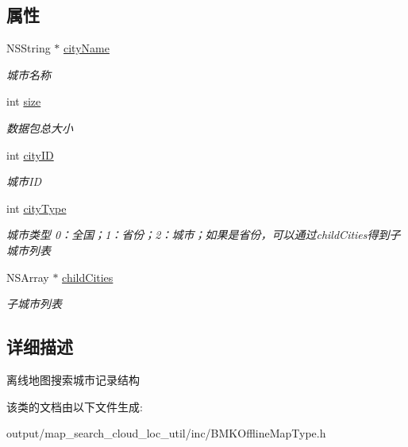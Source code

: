 \subsection*{属性}
\begin{DoxyCompactItemize}
\item 
\hypertarget{interface_b_m_k_o_l_search_record_a9b511c21c21f4b67eef345b11c0e9826}{N\+S\+String $\ast$ \hyperlink{interface_b_m_k_o_l_search_record_a9b511c21c21f4b67eef345b11c0e9826}{city\+Name}}\label{interface_b_m_k_o_l_search_record_a9b511c21c21f4b67eef345b11c0e9826}

\begin{DoxyCompactList}\small\item\em 城市名称 \end{DoxyCompactList}\item 
\hypertarget{interface_b_m_k_o_l_search_record_a65d925120ac45eec0047bad23225f67f}{int \hyperlink{interface_b_m_k_o_l_search_record_a65d925120ac45eec0047bad23225f67f}{size}}\label{interface_b_m_k_o_l_search_record_a65d925120ac45eec0047bad23225f67f}

\begin{DoxyCompactList}\small\item\em 数据包总大小 \end{DoxyCompactList}\item 
\hypertarget{interface_b_m_k_o_l_search_record_a45d36f0768cca26895c7078900ad8d7b}{int \hyperlink{interface_b_m_k_o_l_search_record_a45d36f0768cca26895c7078900ad8d7b}{city\+I\+D}}\label{interface_b_m_k_o_l_search_record_a45d36f0768cca26895c7078900ad8d7b}

\begin{DoxyCompactList}\small\item\em 城市\+I\+D \end{DoxyCompactList}\item 
\hypertarget{interface_b_m_k_o_l_search_record_a74c11b249d3d97503c4a4efa880cc99a}{int \hyperlink{interface_b_m_k_o_l_search_record_a74c11b249d3d97503c4a4efa880cc99a}{city\+Type}}\label{interface_b_m_k_o_l_search_record_a74c11b249d3d97503c4a4efa880cc99a}

\begin{DoxyCompactList}\small\item\em 城市类型 0：全国；1：省份；2：城市；如果是省份，可以通过child\+Cities得到子城市列表 \end{DoxyCompactList}\item 
\hypertarget{interface_b_m_k_o_l_search_record_a883fcb06413f7da8b4e8a50e038a3e78}{N\+S\+Array $\ast$ \hyperlink{interface_b_m_k_o_l_search_record_a883fcb06413f7da8b4e8a50e038a3e78}{child\+Cities}}\label{interface_b_m_k_o_l_search_record_a883fcb06413f7da8b4e8a50e038a3e78}

\begin{DoxyCompactList}\small\item\em 子城市列表 \end{DoxyCompactList}\end{DoxyCompactItemize}


\subsection{详细描述}
离线地图搜索城市记录结构 

该类的文档由以下文件生成\+:\begin{DoxyCompactItemize}
\item 
output/map\+\_\+search\+\_\+cloud\+\_\+loc\+\_\+util/inc/B\+M\+K\+Offline\+Map\+Type.\+h\end{DoxyCompactItemize}
